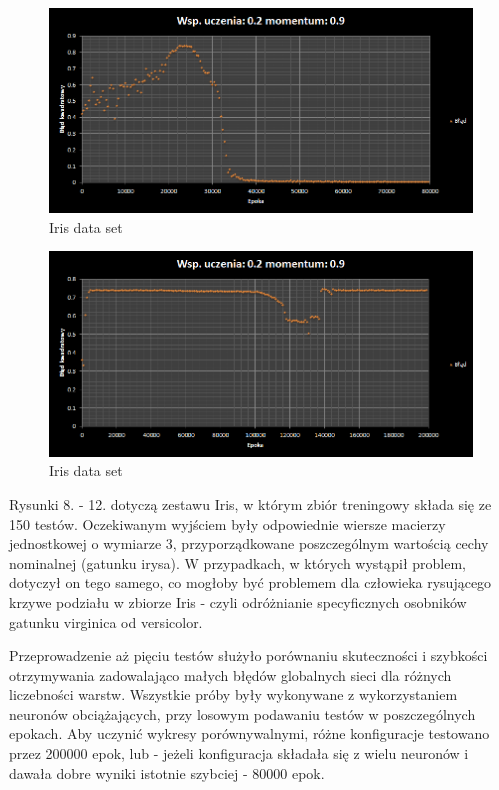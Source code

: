 \documentclass{classrep}
\begin{document}
\begin{figure}[ht]
\centering
			\includegraphics[scale=0.65]{pictures/Iris04.png}
	\caption{Iris data set}
	\label{fig:Iris data set}
\end{figure}

\begin{figure}[ht]
\centering
			\includegraphics[scale=0.65]{pictures/Iris05.png}
	\caption{Iris data set}
	\label{fig:Iris data set}
\end{figure}

\clearpage

Rysunki 8. - 12. dotyczą zestawu Iris, w którym zbiór treningowy składa się ze 150 testów.
Oczekiwanym wyjściem były odpowiednie wiersze macierzy jednostkowej o wymiarze 3,
przyporządkowane poszczególnym wartością cechy nominalnej (gatunku irysa).
W przypadkach, w których wystąpił problem, dotyczył on tego samego, co mogłoby być
problemem dla człowieka rysującego krzywe podziału w zbiorze Iris - czyli
odróżnianie specyficznych osobników gatunku virginica od versicolor.

Przeprowadzenie aż pięciu testów
służyło porównaniu skuteczności i szybkości otrzymywania zadowalająco
małych błędów globalnych sieci dla różnych liczebności warstw. Wszystkie próby
były wykonywane z wykorzystaniem neuronów obciążających, przy losowym podawaniu
testów w poszczególnych epokach. Aby uczynić wykresy porównywalnymi, różne konfiguracje
testowano przez 200000 epok, lub - jeżeli konfiguracja składała się z wielu neuronów
i dawała dobre wyniki istotnie szybciej - 80000 epok. \\
\end{document}
